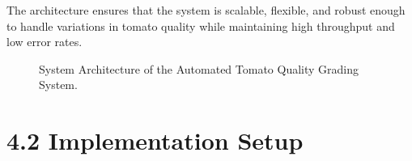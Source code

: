 \documentclass[12pt,a4paper]{report}
\begin{document}
The architecture ensures that the system is scalable, flexible, and robust enough to handle variations in tomato quality while maintaining high throughput and low error rates.

\begin{figure}[h]
	\renewcommand\thefigure{4.1}
	\centering
	\caption{System Architecture of the Automated Tomato Quality Grading System.}
	\label{fig:System_Architecture}
\end{figure}

\section*{4.2 Implementation Setup}
\end{document}

